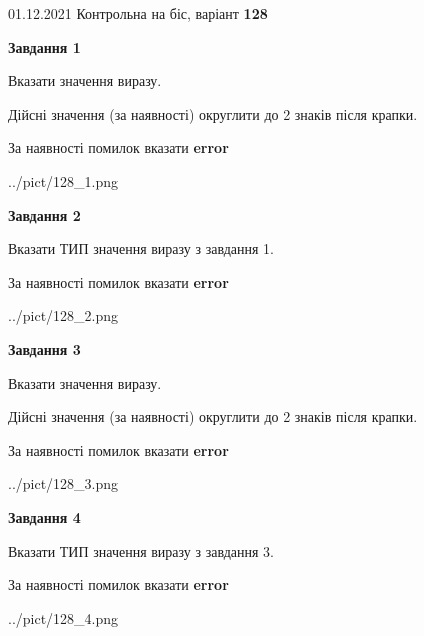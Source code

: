\documentclass[11pt, ukrainian]{article}
\begin{document}
{01.12.2021 Контрольна на біс, варіант  \No \textbf { 128 }\par}
{
\begin {large}
{\begin {center}\textbf{Завдання 1}\end {center}}\par
Вказати значення виразу. \par
Дійсні значення (за наявності) округлити до 2 знаків після крапки. \par
За наявності помилок вказати \textbf{error}

\begin{center}
	{../pict/128_1.png}
\end{center}
\newpage

{\begin {center}\textbf{Завдання 2}\end {center}}\par
Вказати ТИП значення виразу з завдання 1. \par
За наявності помилок вказати \textbf{error}

\begin{center}
	{../pict/128_2.png}
\end{center}
\newpage

{\begin {center}\textbf{Завдання 3}\end {center}}\par
Вказати значення виразу. \par
Дійсні значення (за наявності) округлити до 2 знаків після крапки. \par
За наявності помилок вказати \textbf{error}

\begin{center}
	{../pict/128_3.png}
\end{center}
\newpage

{\begin {center}\textbf{Завдання 4}\end {center}}\par
Вказати ТИП значення виразу з завдання 3. \par
За наявності помилок вказати \textbf{error}

\begin{center}
	{../pict/128_4.png}
\end{center}
\newpage


\end{large}}
\end{document}
